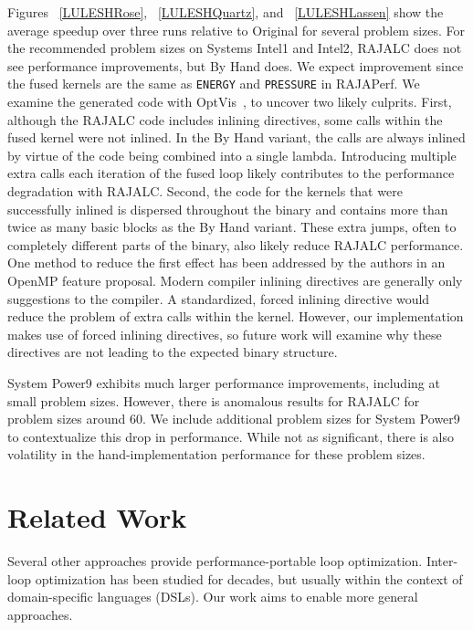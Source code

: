 Figures ~\ref{LULESHRose}, ~\ref{LULESHQuartz}, and ~\ref{LULESHLassen} show
the average speedup over three runs relative to Original for several problem
sizes. 
For the recommended problem sizes on Systems Intel1 and Intel2, RAJALC does
not see performance improvements, but By Hand does.
We expect improvement since the fused kernels are the same as \verb.ENERGY.
and \verb.PRESSURE. in RAJAPerf.
We examine the generated code with OptVis~\cite{devkota2020ccnav}, to uncover
two likely culprits.
First, although the RAJALC code includes inlining directives, some calls
within the fused kernel were not inlined. 
In the By Hand variant, the calls are always inlined by virtue of the code
being combined into a single lambda. 
Introducing multiple extra calls each iteration of the fused loop likely
contributes to the performance degradation with RAJALC.
Second, the code for the kernels that were successfully inlined is dispersed
throughout the binary and contains more than twice as many basic blocks as
the By Hand variant. 
These extra jumps, often to completely different parts of the binary, also
likely reduce RAJALC performance. 
One method to reduce the first effect has been addressed by the authors 
in an OpenMP feature proposal. Modern compiler inlining directives are generally 
only suggestions to the compiler. A standardized, forced inlining directive would 
reduce the problem of extra calls within the kernel.
However, our implementation makes use of forced inlining directives, 
so future work will examine why these directives are not leading to the expected binary structure.

System Power9 exhibits much larger performance improvements, including at small
problem sizes. 
However, there is anomalous results for RAJALC for problem sizes around 60. 
We include additional problem sizes for System Power9 to contextualize this drop in performance. 
While not as significant, there is also volatility in the hand-implementation performance for these problem sizes.

\section{Related Work}

Several other approaches provide performance-portable loop optimization.
Inter-loop optimization has been studied for decades, but usually
within the context of domain-specific languages (DSLs).
Our work aims to enable more general approaches.

